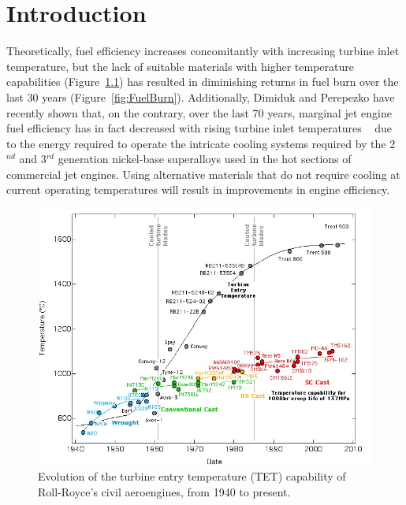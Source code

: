 \chapter{Introduction}\label{sec:intro}
Theoretically, fuel efficiency increases concomitantly with increasing turbine inlet temperature, but the lack of suitable materials with higher temperature capabilities (Figure~\ref{fig:TET}) has resulted in diminishing returns in fuel burn over the last 30 years (Figure~\ref{fig:FuelBurn}).  Additionally, Dimiduk and Perepezko have recently shown that, on the contrary, over the last 70 years, marginal jet engine fuel efficiency has in fact decreased with rising turbine inlet temperatures ~\cite{dimiduk03} due to the energy required to operate the intricate cooling systems required by the 2$^{nd}$ and 3$^{rd}$ generation nickel-base superalloys used in the hot sections of commercial jet engines.  Using alternative materials that do not require cooling at current operating temperatures will result in improvements in engine efficiency.
%
\begin{figure}[htbp]
\begin{center}
\includegraphics[width=\textwidth]{TET}
\caption{Evolution of the turbine entry temperature (TET) capability of Roll-Royce's civil aeroengines, from 1940 to present.}\label{fig:TET}
\end{center}
\end{figure}
%
